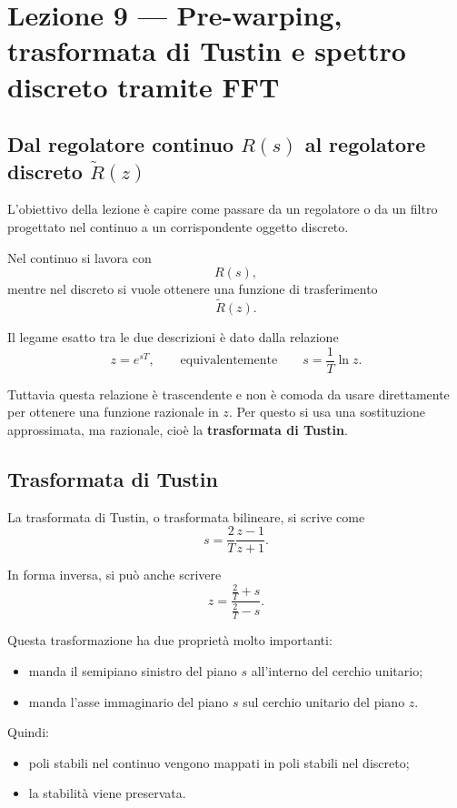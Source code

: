 \chapter{Lezione 9 --- Pre-warping, trasformata di Tustin e spettro discreto tramite FFT}

\section{Dal regolatore continuo \(R(s)\) al regolatore discreto \(\tilde R(z)\)}

L'obiettivo della lezione è capire come passare da un regolatore o da un filtro
progettato nel continuo a un corrispondente oggetto discreto.

Nel continuo si lavora con
\[
R(s),
\]
mentre nel discreto si vuole ottenere una funzione di trasferimento
\[
\tilde R(z).
\]

Il legame esatto tra le due descrizioni è dato dalla relazione
\[
z=e^{sT},
\qquad\text{equivalentemente}\qquad
s=\frac{1}{T}\ln z.
\]

Tuttavia questa relazione è trascendente e non è comoda da usare direttamente
per ottenere una funzione razionale in \(z\).
Per questo si usa una sostituzione approssimata, ma razionale, cioè la
\textbf{trasformata di Tustin}.

\section{Trasformata di Tustin}

La trasformata di Tustin, o trasformata bilineare, si scrive come
\[
s=\frac{2}{T}\frac{z-1}{z+1}.
\]

In forma inversa, si può anche scrivere
\[
z=\frac{\frac{2}{T}+s}{\frac{2}{T}-s}.
\]

Questa trasformazione ha due proprietà molto importanti:
\begin{itemize}
    \item manda il semipiano sinistro del piano \(s\) all'interno del cerchio unitario;
    \item manda l'asse immaginario del piano \(s\) sul cerchio unitario del piano \(z\).
\end{itemize}

Quindi:
\begin{itemize}
    \item poli stabili nel continuo vengono mappati in poli stabili nel discreto;
    \item la stabilità viene preservata.
\end{itemize}

